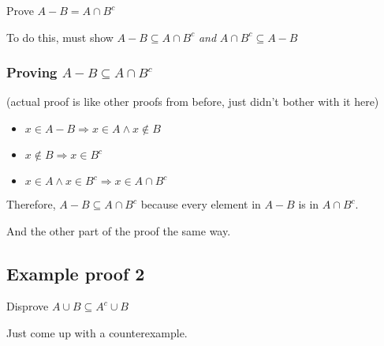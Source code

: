 \documentclass[12pt, leqno]{article}
\begin{document}
Prove $A - B = A \cap B^c$

To do this, must show $A - B \subseteq A \cap B^c$ \emph{and} $A \cap B^c \subseteq A - B$

\subsubsection*{Proving $A - B \subseteq A \cap B^c$}

(actual proof is like other proofs from before, just didn't bother with it here)
\begin{itemize}
    \item $x \in A - B \Rightarrow x \in A \land x \not\in B$
    \item $x \not\in B \Rightarrow x \in B^c$
    \item $x \in A \land x \in B^c \Rightarrow x \in A \cap B^c$
\end{itemize}

Therefore, $A - B \subseteq A \cap B^c$ because every element in $A - B$ is in $A \cap B^c$.

And the other part of the proof the same way.

\subsection{Example proof 2}

Disprove $A \cup B \subseteq A^c \cup B$

Just come up with a counterexample.
\end{document}
